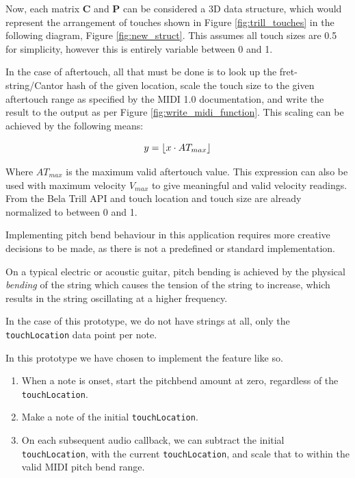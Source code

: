 Now, each matrix $\mathbf{C}$ and $\mathbf{P}$ can be considered a 3D data structure, which would represent the arrangement of touches shown in Figure \ref{fig:trill_touches} in the following diagram, Figure \ref{fig:new_struct}. This assumes all touch sizes are 0.5 for simplicity, however this is entirely variable between 0 and 1. 


 
In the case of aftertouch, all that must be done is to look up the fret-string/Cantor hash of the given location, scale the touch size to the given aftertouch range as specified by the MIDI 1.0 documentation, and write the result to the output as per Figure \ref{fig:write_midi_function}. This scaling can be achieved by the following means:

\DeclarePairedDelimiter\ceil{\lceil}{\rceil}
\DeclarePairedDelimiter\floor{\lfloor}{\rfloor}
\begin{equation}
    y = \floor{x \cdot AT_{max}}
    \label{eq:scaling}
\end{equation}

Where $AT_{max}$ is the maximum valid aftertouch value. This expression can also be used with maximum velocity $V_{max}$ to give meaningful and valid velocity readings. From the Bela Trill API and touch location and touch size are already normalized to between 0 and 1. 

Implementing pitch bend behaviour in this application requires more creative decisions to be made, as there is not a predefined or standard implementation. 

On a typical electric or acoustic guitar, pitch bending is achieved by the physical \textit{bending} of the string which causes the tension of the string to increase, which results in the string oscillating at a higher frequency. 

In the case of this prototype, we do not have strings at all, only the \texttt{touchLocation} data point per note. 

In this prototype we have chosen to implement the feature like so. 

\begin{enumerate}
    \item When a note is onset, start the pitchbend amount at zero, regardless of the \texttt{touchLocation}. 
    \item Make a note of the initial \texttt{touchLocation}. 
    \item On each subsequent audio callback, we can subtract the initial \texttt{touchLocation}, with the current  \texttt{touchLocation}, and scale that to within the valid MIDI pitch bend range. 
\end{enumerate}

